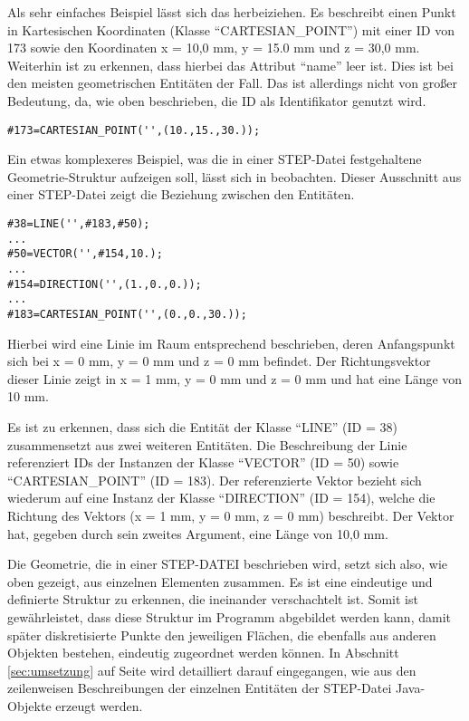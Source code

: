 Als sehr einfaches Beispiel lässt sich das  herbeiziehen. Es beschreibt einen Punkt in Kartesischen Koordinaten (Klasse "`CARTESIAN\_POINT"') mit einer ID von 173 sowie den Koordinaten x = 10,0 mm, y = 15.0 mm und z = 30,0 mm. Weiterhin ist zu erkennen, dass hierbei das Attribut "`name"' leer ist. Dies ist bei den meisten geometrischen Entitäten der Fall. Das ist allerdings nicht von großer Bedeutung, da, wie oben beschrieben, die ID als Identifikator genutzt wird.    

\begin{lstlisting}[captionpos=b, style=customc, caption=Beschreibung eines Punktes in STEP, label=lis:simplestp]
#173=CARTESIAN_POINT('',(10.,15.,30.));
\end{lstlisting}

Ein etwas komplexeres Beispiel, was die in einer STEP-Datei festgehaltene Geometrie-Struktur aufzeigen soll, lässt sich in  beobachten. Dieser Ausschnitt aus einer STEP-Datei zeigt die Beziehung zwischen den Entitäten. 


\begin{lstlisting}[captionpos=b, style=customc, caption=Beschreibung einer Linie in STEP, label=lis:exmpllinestp]
#38=LINE('',#183,#50);
...
#50=VECTOR('',#154,10.);
...
#154=DIRECTION('',(1.,0.,0.));
...
#183=CARTESIAN_POINT('',(0.,0.,30.));
\end{lstlisting} 

Hierbei wird eine Linie im Raum entsprechend beschrieben, deren Anfangspunkt sich bei x = 0 mm, y = 0 mm und z = 0 mm befindet. Der Richtungsvektor dieser Linie zeigt in x = 1 mm, y = 0 mm und z = 0 mm und hat eine Länge von 10 mm.

Es ist zu erkennen, dass sich die Entität der Klasse "`LINE"' (ID = 38) zusammensetzt aus zwei weiteren Entitäten. Die Beschreibung der Linie referenziert IDs der Instanzen der Klasse "`VECTOR"' (ID = 50) sowie "`CARTESIAN\_POINT"' (ID = 183). Der referenzierte Vektor bezieht sich wiederum auf eine Instanz der Klasse "`DIRECTION"' (ID = 154), welche die Richtung des Vektors (x = 1 mm, y = 0 mm, z = 0 mm) beschreibt. Der Vektor hat, gegeben durch sein zweites Argument, eine Länge von 10,0 mm.

Die Geometrie, die in einer STEP-DATEI beschrieben wird, setzt sich also, wie oben gezeigt, aus einzelnen Elementen zusammen. Es ist eine eindeutige und definierte Struktur zu erkennen, die ineinander verschachtelt ist. Somit ist gewährleistet, dass diese Struktur im Programm abgebildet werden kann, damit später diskretisierte Punkte den jeweiligen Flächen, die ebenfalls aus anderen Objekten bestehen, eindeutig zugeordnet werden können. 
In Abschnitt \ref{sec:umsetzung} auf Seite \pageref{sec:umsetzung} wird detailliert darauf eingegangen, wie aus den zeilenweisen Beschreibungen der einzelnen Entitäten der STEP-Datei Java-Objekte erzeugt werden.              

